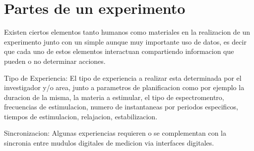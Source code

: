 \section{Partes de un experimento}

Existen ciertos elementos tanto humanos como materiales en la realizacion de un experimento junto con un 
simple aunque muy importante uso de datos, es decir que cada uno de estos elementos interactuan compartiendo
informacion que pueden o no determinar acciones.

Tipo de Experiencia:
El tipo de experiencia a realizar esta determinada por el investigador y/o area, junto a parametros de planificacion
como por ejemplo la duracion de la misma, la materia a estimular, el tipo de espectromentro, frecuencias
de estimulacion, numero de instantaneas por periodos especificos, tiempos de estimulacion, relajacion, estabilizacion.

Sincronizacion:
Algunas experiencias requieren o se complementan con la sincronia entre mudulos digitales de medicion via interfaces 
digitales.